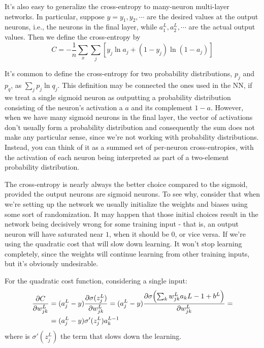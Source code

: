 It's also easy to generalize the cross-entropy to many-neuron multi-layer networks. In particular, suppose $y=y_1,y_2,\cdots$ are the desired values at the output neurons, i.e., the neurons in the final layer, while $a^L_1,a^L_2,\cdots$ are the actual output values. Then we define the cross-entropy by
\begin{equation}
C = -\frac{1}{n}\sum_x \sum_j  \left[ y_j \ln a_j + (1-y_j) \ln(1-a_j)\right]
\end{equation}

It's common to define the cross-entropy for two probability distributions, $p_j$  and $p_q$, as $\sum_j p_j \ln q_j$. This definition may be connected the ones used in the NN, if we treat a single sigmoid neuron as outputting a probability distribution consisting of the neuron's activation a $a$ and its complement $1-a$. However, when we have many sigmoid neurons in the final layer, the vector of activations don't usually form a probability distribution and consequently the sum does not make any particular sense, since we're not working with probability distributions. Instead, you can think of it as a summed set of per-neuron cross-entropies, with the activation of each neuron being interpreted as part of a two-element probability distribution.

The cross-entropy is nearly always the better choice compared to the sigmoid, provided the output neurons are sigmoid neurons. To see why, consider that when we're setting up the network we usually initialize the weights and biases using some sort of randomization. It may happen that those initial choices result in the network being decisively wrong for some training input - that is, an output neuron will have saturated near $1$, when it should be $0$, or vice versa. If we're using the quadratic cost that will slow down learning. It won't stop learning completely, since the weights will continue learning from other training inputs, but it's obviously undesirable.

For the quadratic cost function, considering a single input:
\begin{equation}
\begin{aligned}
\frac{\pr C}{\pr w_{jk}^L} &= (a_{j}^L-y) \frac{\pr \sigma(z_{j}^L)}{\pr w_{jk}^L}  =(a_{j}^L-y)  \frac{\pr \sigma\br{\sum_k w_{jk}^L a_k{L-1}+b^L}}{\pr w_{jk}^L} =
\\&= (a_{j}^L-y) \sigma'(z_j^L) a_k^{L-1}
\end{aligned}
\end{equation}
where is $\sigma'(z_j^L)$ the term that slows down the learning.

